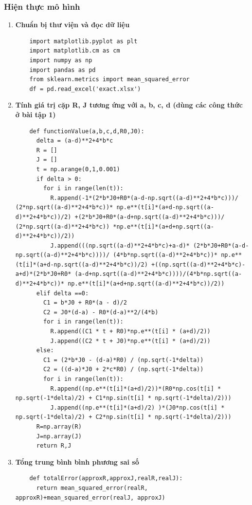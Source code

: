 \documentclass[a4paper]{article}
\begin{document}
\subsubsection{Hiện thực mô hình}
\begin{enumerate}
    \item \textbf{Chuẩn bị thư viện và đọc dữ liệu}
    \begin{lstlisting}
    import matplotlib.pyplot as plt
    import matplotlib.cm as cm
    import numpy as np
    import pandas as pd
    from sklearn.metrics import mean_squared_error
    df = pd.read_excel('exact.xlsx')
    \end{lstlisting}
    \item \textbf{Tính giá trị cặp R, J tương ứng với a, b, c, d (dùng các công thức ở bài tập 1)}
    \begin{lstlisting}
    def functionValue(a,b,c,d,R0,J0):
      delta = (a-d)**2+4*b*c
      R = []
      J = []
      t = np.arange(0,1,0.001)
      if delta > 0:
        for i in range(len(t)):
          R.append(-1*(2*b*J0+R0*(a-d-np.sqrt((a-d)**2+4*b*c)))/ (2*np.sqrt((a-d)**2+4*b*c))* np.e**(t[i]*(a+d-np.sqrt((a-d)**2+4*b*c))/2) +(2*b*J0+R0*(a-d+np.sqrt((a-d)**2+4*b*c)))/ (2*np.sqrt((a-d)**2+4*b*c)) *np.e**(t[i]*(a+d+np.sqrt((a-d)**2+4*b*c))/2))
          J.append(((np.sqrt((a-d)**2+4*b*c)+a-d)* (2*b*J0+R0*(a-d-np.sqrt((a-d)**2+4*b*c))))/ (4*b*np.sqrt((a-d)**2+4*b*c))* np.e**(t[i]*(a+d-np.sqrt((a-d)**2+4*b*c))/2) +((np.sqrt((a-d)**2+4*b*c)-a+d)*(2*b*J0+R0* (a-d+np.sqrt((a-d)**2+4*b*c))))/(4*b*np.sqrt((a-d)**2+4*b*c))* np.e**(t[i]*(a+d+np.sqrt((a-d)**2+4*b*c))/2))
      elif delta ==0:
        C1 = b*J0 + R0*(a - d)/2
        C2 = J0*(d-a) - R0*(d-a)**2/(4*b)
        for i in range(len(t)):
          R.append((C1 * t + R0)*np.e**(t[i] * (a+d)/2))
          J.append((C2 * t + J0)*np.e**(t[i] * (a+d)/2))
      else:
        C1 = (2*b*J0 - (d-a)*R0) / (np.sqrt(-1*delta))
        C2 = ((d-a)*J0 + 2*c*R0) / (np.sqrt(-1*delta))
        for i in range(len(t)):
          R.append((np.e**(t[i]*(a+d)/2))*(R0*np.cos(t[i] * np.sqrt(-1*delta)/2) + C1*np.sin(t[i] * np.sqrt(-1*delta)/2)))
          J.append((np.e**(t[i]*(a+d)/2) )*(J0*np.cos(t[i] * np.sqrt(-1*delta)/2) + C2*np.sin(t[i] * np.sqrt(-1*delta)/2)))
      R=np.array(R)
      J=np.array(J)
      return R,J 
    \end{lstlisting}
    \item \textbf{Tổng trung bình bình phương sai số}
    \begin{lstlisting}
    def totalError(approxR,approxJ,realR,realJ):
      return mean_squared_error(realR, approxR)+mean_squared_error(realJ, approxJ)

\end{lstlisting}
\end{enumerate}
\end{document}
